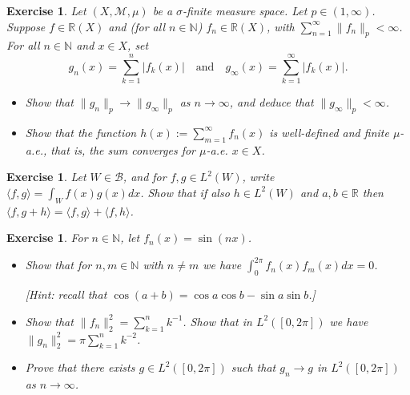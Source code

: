 \documentclass{article}
\newtheorem{exercise}[theorem]{Exercise}
\begin{document}
\begin{exercise}
Let $(X, \mathcal{M}, \mu)$ be a $\sigma$-finite measure space. Let $p \in (1, \infty)$. Suppose $f \in \mathbb{R}(X)$ and (for all $n \in \mathbb{N}$) $f_n \in \mathbb{R}(X)$, with $\sum_{n=1}^{\infty} \|f_n\|_p < \infty$. For all $n \in \mathbb{N}$ and $x \in X$, set
\[
g_n(x) = \sum_{k=1}^{n} |f_k(x)| \quad \text{and} \quad g_{\infty}(x) = \sum_{k=1}^{\infty} |f_k(x)|.
\]
\begin{itemize}
    \item[(i)] Show that $\|g_n\|_p \to \|g_{\infty}\|_p$ as $n \to \infty$, and deduce that $\|g_{\infty}\|_p < \infty$.
    
    \item[(ii)] Show that the function $h(x) := \sum_{m=1}^{\infty} f_n(x)$ is well-defined and finite $\mu$-a.e., that is, the sum converges for $\mu$-a.e. $x \in X$.
\end{itemize}
\end{exercise}

\begin{exercise}
Let $W \in \mathcal{B}$, and for $f, g \in L^2(W)$, write $\langle f, g \rangle = \int_W f(x)g(x)dx$. Show that if also $h \in L^2(W)$ and $a, b \in \mathbb{R}$ then $\langle f, g + h \rangle = \langle f, g \rangle + \langle f, h \rangle$.
\end{exercise}

\begin{exercise}
For $n \in \mathbb{N}$, let $f_n(x) = \sin(n x)$.
\begin{itemize}
    \item[(a)] Show that for $n, m \in \mathbb{N}$ with $n \neq m$ we have $\int_0^{2\pi} f_n(x) f_m(x)dx = 0$.
    
    \textit{[Hint: recall that $\cos(a + b) = \cos a \cos b - \sin a \sin b$.]}
    
    \item[(b)] Show that $\|f_n\|_2^2 = \sum_{k=1}^{n} k^{-1}$. Show that in $L^2([0,2\pi])$ we have $\|g_n\|_2^2 = \pi \sum_{k=1}^{n} k^{-2}$.
    
    \item[(c)] Prove that there exists $g \in L^2([0,2\pi])$ such that $g_n \to g$ in $L^2([0,2\pi])$ as $n \to \infty$.
\end{itemize}
\end{exercise}
\end{document}
